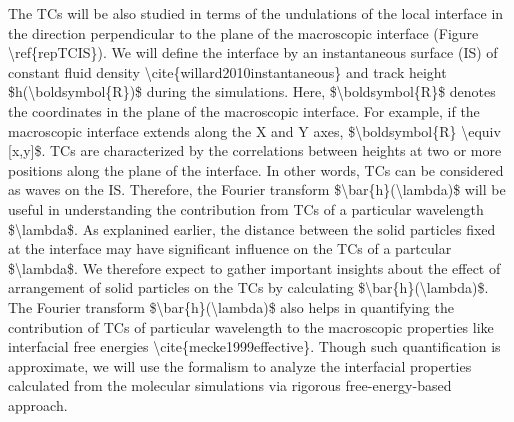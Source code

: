 \par The TCs will be also studied in terms of the undulations of the local interface in the direction perpendicular to the plane of the macroscopic interface (Figure \textbackslash ref\{repTCIS\}). We will define the interface by an instantaneous surface (IS) of constant fluid density \textbackslash cite\{willard2010instantaneous\} and track height \$h(\textbackslash boldsymbol\{R\})\$ during the simulations. Here, \$\textbackslash boldsymbol\{R\}\$ denotes the coordinates in the plane of the macroscopic interface. For example, if the macroscopic interface extends along the X and Y axes, \$\textbackslash boldsymbol\{R\} \textbackslash equiv [x,y]\$. TCs are characterized by the correlations between heights at two or more positions along the plane of the interface. In other words, TCs can be considered as waves on the IS. Therefore, the Fourier transform \$\textbackslash bar\{h\}(\textbackslash lambda)\$ will be useful in understanding the contribution from TCs of a particular wavelength \$\textbackslash lambda\$. As explanined earlier, the distance between the solid particles fixed at the interface may have significant influence on the TCs of a partcular \$\textbackslash lambda\$. We therefore  expect to gather important insights about the effect of arrangement of solid particles on the TCs by calculating \$\textbackslash bar\{h\}(\textbackslash lambda)\$. The Fourier transform \$\textbackslash bar\{h\}(\textbackslash lambda)\$ also helps in quantifying the contribution of TCs of particular wavelength to the macroscopic properties like interfacial free energies \textbackslash cite\{mecke1999effective\}. Though such quantification is approximate, we will use the formalism to analyze the interfacial properties calculated from the molecular simulations via rigorous free-energy-based approach.
